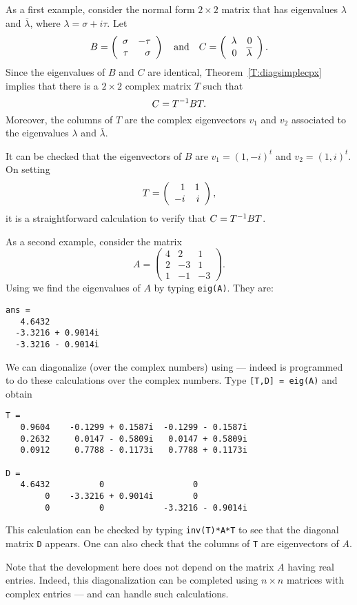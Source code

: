 As a first example, consider the normal form $2\times 2$ matrix 
 that has eigenvalues $\lambda$ and $\overline{\lambda}$, 
where $\lambda=\sigma+i\tau$.   Let 
\[
B = \left(\begin{array}{rr} \sigma & -\tau\\ \tau &\sigma\end{array}\right) \quad\mbox{and}\quad 
C = \left(\begin{array}{rr} \lambda & 0\\ 0 &\overline{\lambda}\end{array}\right).
\]
Since the eigenvalues of $B$ and $C$ are identical, 
Theorem~\ref{T:diagsimplecpx} implies that there is a $2\times 2$ complex 
matrix $T$ such that
\begin{equation}  \label{E:BCsimilar}
C = T^{-1} B T.
\end{equation}
Moreover, the columns of $T$ are the complex eigenvectors $v_1$ and $v_2$
associated to the eigenvalues $\lambda$ and $\overline{\lambda}$.

It can be checked that the eigenvectors of $B$ are $v_1=(1,-i)^t$ and 
$v_2=(1,i)^t$.  On setting 
\[
T = \left(\begin{array}{rr} 1 & 1\\ -i &i\end{array}\right),
\]
it is a straightforward calculation to verify that $C=T^{-1} BT$.  


As a second example, consider the matrix 
\begin{equation*}
A = \left(\begin{array}{rrr}     4  &   2   &  1\\
     2  &  -3  &   1\\  1 &   -1  &  -3 \end{array} \right).
\end{equation*}
Using \Matlab we find the eigenvalues of $A$ by typing {\tt eig(A)}. 
They are:
\begin{verbatim}
ans =
   4.6432          
  -3.3216 + 0.9014i
  -3.3216 - 0.9014i
\end{verbatim}
We can diagonalize (over the complex numbers) using \Matlab --- indeed 
\Matlab is programmed to do these calculations over the complex numbers. 
Type {\tt [T,D] = eig(A)} and obtain
\begin{verbatim}
T =
   0.9604    -0.1299 + 0.1587i  -0.1299 - 0.1587i
   0.2632     0.0147 - 0.5809i   0.0147 + 0.5809i
   0.0912     0.7788 - 0.1173i   0.7788 + 0.1173i

D =
   4.6432          0                  0          
        0    -3.3216 + 0.9014i        0          
        0          0            -3.3216 - 0.9014i
\end{verbatim}
This calculation can be checked by typing {\tt inv(T)*A*T} to see that 
the diagonal matrix {\tt D} appears.  
One can also check that the columns of 
{\tt T} are eigenvectors of $A$.

Note that the development here does not depend on the matrix $A$ having 
real entries.  Indeed, this diagonalization can be completed using 
$n\times n$ matrices with complex entries --- and \Matlab can handle such 
calculations.


